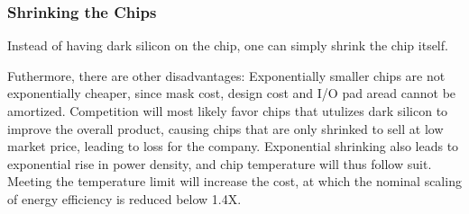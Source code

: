 \subsubsection{Shrinking the Chips}

Instead of having dark silicon on the chip, one can simply shrink the chip itself.

Futhermore, there are other disadvantages: Exponentially smaller chips are not exponentially cheaper, since mask cost, design cost and I/O pad aread cannot be amortized. 
Competition will most likely favor chips that utulizes dark silicon to improve the overall product, causing chips that are only shrinked to sell at low market price, leading to loss for the company.
Exponential shrinking also leads to exponential rise in power density, and chip temperature will thus follow suit.
Meeting the temperature limit will increase the cost, at which the nominal scaling of energy efficiency is reduced below 1.4X.



